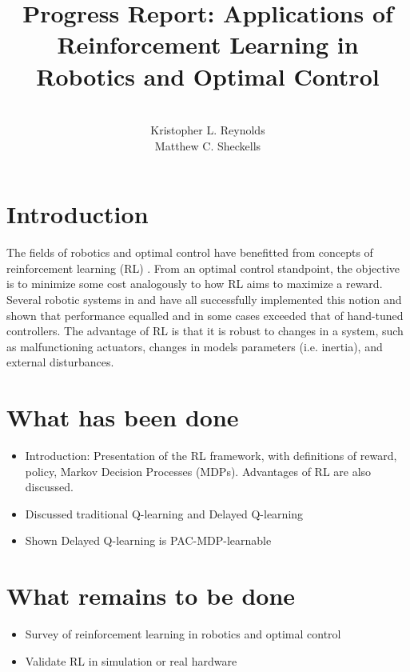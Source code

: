 \documentclass[10pt]{article}
\begin{document}
\title{Progress Report: Applications of Reinforcement Learning in Robotics and Optimal Control}%
\author{\\ %
Kristopher L. Reynolds\\
Matthew C. Sheckells
\\} %
\maketitle
\section{Introduction}
The fields of robotics and optimal control have benefitted from concepts of reinforcement learning (RL) \cite{kober_reinforcement_2013} \cite{kaelbling_reinforcement_1996}. From an optimal control standpoint, the objective is to minimize some cost analogously to how RL aims to maximize a reward.  Several robotic systems in  \cite{bhasin_reinforcement_2011} and \cite{hester_rtmba:_2012} have all successfully implemented this notion and shown that performance equalled and in some cases exceeded that of hand-tuned controllers. The advantage of RL is that it is robust to changes in a system, such as malfunctioning actuators, changes in models parameters (i.e. inertia), and external disturbances. 




\section{What has been done}
\begin{itemize}
\item Introduction: Presentation of the RL framework, with definitions of reward, policy, Markov Decision Processes (MDPs). Advantages of RL are also discussed.
\item Discussed traditional Q-learning and Delayed Q-learning
\item Shown Delayed Q-learning is PAC-MDP-learnable
\end{itemize}


\section{What remains to be done}
\begin{itemize}
\item Survey of reinforcement learning in robotics and optimal control 
\item Validate RL in simulation or real hardware
\end{itemize}
\end{document}
